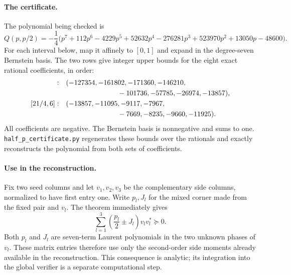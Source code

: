 \documentclass[11pt]{article}
\begin{document}
\paragraph{The certificate.}
The polynomial being checked is
\[
 Q(p,p/2)=-\frac14\bigl(p^7+112p^6-4229p^5+52632p^4
 -276281p^3+523970p^2+13050p-48600\bigr).
\]
For each interval below, map it affinely to $[0,1]$ and expand in the
degree-seven Bernstein basis. The two rows give integer upper bounds
for the eight exact rational coefficients, in order:
\begin{align*}
[27/16,21/4]:\quad&(-127354,-161802,-171360,-146210,\\
&\hspace{26mm}-101736,-57785,-26974,-13857),\\
[21/4,6]:\quad&(-13857,-11095,-9117,-7967,\\
&\hspace{26mm}-7669,-8235,-9660,-11925).
\end{align*}
All coefficients are negative. The Bernstein basis is nonnegative and
sums to one. \texttt{half\_p\_certificate.py} regenerates these bounds
over the rationals and exactly reconstructs the polynomial from both
sets of coefficients.

\paragraph{Use in the reconstruction.}
Fix two seed columns and let $v_1,v_2,v_3$ be the complementary side
columns, normalized to have first entry one. Write $p_l,J_l$ for the
mixed corner made from the fixed pair and $v_l$. The theorem immediately
gives
\[
 \sum_{l=1}^3\left(\frac{p_l}{2}\pm J_l\right)v_lv_l^*\succeq0.
\]
Both $p_l$ and $J_l$ are seven-term Laurent polynomials in the two
unknown phases of $v_l$. These matrix entries therefore use only the
second-order side moments already available in the reconstruction.
This consequence is analytic; its integration into the global verifier
is a separate computational step.
\end{document}
